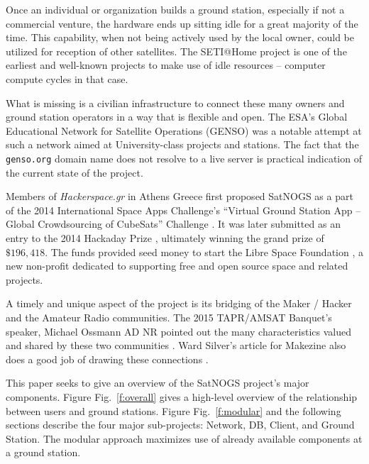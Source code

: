\documentclass[conference,letterpaper,12pt]{IEEEtran}
\newcommand{\figref}[1]{Fig.~\ref{#1}}
\newcommand*{\pmzeroslash}{%
    \sbox0{0}%
    \sbox2{/}%
    \sbox4{%
      \raise\dimexpr((\ht0-\dp0)-(\ht2-\dp2))/2\relax\copy2 %
    }%
    \ooalign{%
      \hfill\copy4 \hfill\cr
      \hfill0\hfill\cr
    }%
    \vphantom{0\copy4 }%
}
\begin{document}
Once an individual or organization builds a ground station, especially if not a commercial venture, the hardware ends up sitting idle for a great majority of the time.
This capability, when not being actively used by the local owner, could be utilized for reception of other satellites.
The SETI@Home \cite{SETI@home} project is one of the earliest and well-known projects to make use of idle resources -- computer compute cycles in that case.

What is missing is a civilian infrastructure to connect these many owners and ground station operators in a way that is flexible and open.
The ESA's Global Educational Network for Satellite Operations (GENSO) \cite{GENSO} was a notable attempt at such a network aimed at University-class projects and stations.
The fact that the \verb|genso.org| domain name does not resolve to a live server is practical indication of the current state of the project.

Members of \emph{Hackerspace.gr} \cite{Hackerspacegr} in Athens Greece first proposed SatNOGS as a part of the 2014 International Space Apps Challenge's ``Virtual Ground Station App -- Global Crowdsourcing of CubeSats'' Challenge \cite{SpaceAppsChallenge2014-SatNOGS}.
It was later submitted as an entry to the 2014 Hackaday Prize \cite{HackadayPrize2014}, ultimately winning the grand prize of $\$196,418$.
The funds provided seed money to start the Libre Space Foundation \cite{LibreSpaceFoundation}, a new non-profit dedicated to supporting free and open source space and related projects.

A timely and unique aspect of the project is its bridging of the Maker / Hacker and the Amateur Radio communities.
The 2015 TAPR/AMSAT Banquet's speaker, Michael Ossmann AD\pmzeroslash NR pointed out the many characteristics valued and shared by these two communities \cite{HamRadioNow211}.
Ward Silver's article for Makezine also does a good job of drawing these connections \cite{Silver2015}.


This paper seeks to give an overview of the SatNOGS project's major components.
Figure \figref{f:overall} gives a high-level overview of the relationship between users and ground stations.
Figure \figref{f:modular} and the following sections describe the four major sub-projects: Network, DB, Client, and Ground Station.
The modular approach maximizes use of already available components at a ground station.
\end{document}
